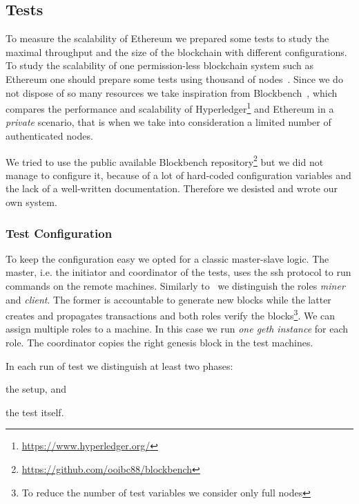\subsection{Tests}

To measure the scalability of Ethereum we prepared some tests to study
the maximal throughput and the size of the blockchain with different
configurations.
To study the scalability of one permission-less blockchain system such as
Ethereum one should prepare some tests using thousand of 
nodes~\cite{bib:securityAndScalabilityPoW, bib:algorand}.
Since we do not dispose of so many resources we take inspiration from
Blockbench~\cite{blockbench}, which compares the performance and scalability
of Hyperledger\footnote{\url{https://www.hyperledger.org/}} and Ethereum in a
\emph{private} scenario, that is when 
we take into consideration a limited number of authenticated nodes.

We tried to use the public available Blockbench 
repository\footnote{\url{https://github.com/ooibc88/blockbench}}
but we did not manage to configure it, because of a lot of hard-coded
configuration variables and the lack of a well-written documentation.
Therefore we desisted and wrote our own system.


\subsubsection{Test Configuration}

To keep the configuration easy we opted for a classic master-slave logic.
The master, i.e. the initiator and coordinator of the tests, uses the ssh
protocol to run commands on the remote machines.
Similarly to~\cite{blockbench} we distinguish the roles \emph{miner} and
\emph{client}. The former is accountable to generate new blocks while the
latter creates and propagates transactions and both roles verify the 
blocks\footnote{To reduce the number of test variables we consider only 
	full nodes}.
We can assign multiple roles to a machine. In this case we run
\emph{one geth instance} for each role.
The coordinator copies the right genesis block in the test machines. 



In each run of test we distinguish at least two phases:
\begin{enumerate*}
	\item the setup, and
	\item the test itself.
\end{enumerate*}


